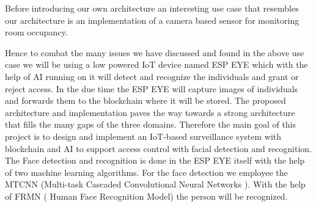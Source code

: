 Before introducing our own architecture an interesting use case that resembles  our architecture is an implementation of a camera based sensor for monitoring room occupancy. 

Hence to combat the many issues we have discussed and found in the above use case we will be using a low powered IoT device named ESP EYE which with the help of AI running on it will detect and recognize the individuals and grant or reject access. In the due time the ESP EYE will capture images of individuals and forwards them to the blockchain where it will be stored. The proposed architecture and implementation paves the way towards a strong architecture that fills the many gaps of the three domains. Therefore the main goal of this project is to design and implement an IoT-based surveillance system with blockchain and AI to support access control with facial detection and recognition. 
The Face detection and recognition is done in the ESP EYE itself with the help of two machine learning algorithms. For the face detection we employee the MTCNN (Multi-task Cascaded Convolutional Neural Networks ). With the help of FRMN ( Human Face Recognition Model) the person will be recognized. 








 
 



